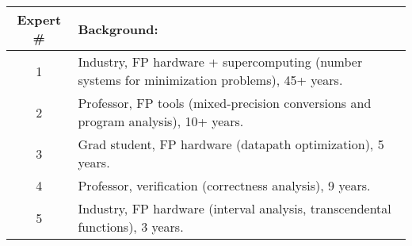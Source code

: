\begin{tabular}{|c|p{6cm}|}
\hline
  Expert \# &  Background: \\
\hline
    1 &  Industry, FP hardware + supercomputing (number systems for minimization problems), 45+ years. \\
\hline
    2 &  Professor, FP tools (mixed-precision conversions and program analysis), 10+ years. \\
\hline
    3 &  Grad student, FP hardware (datapath optimization), 5 years. 
    \\
\hline
    4 &  Professor, verification (correctness analysis), 9 years. \\
\hline
    5 &  Industry, FP hardware (interval analysis, transcendental functions), 3 years. 
    \\
\hline
\end{tabular}
